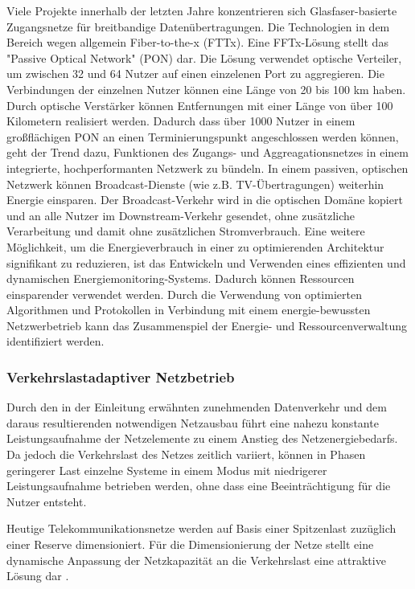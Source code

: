 Viele Projekte innerhalb der letzten Jahre konzentrieren sich Glasfaser-basierte Zugangsnetze für breitbandige Datenübertragungen. Die Technologien in dem Bereich wegen allgemein Fiber-to-the-x (FTTx). Eine FFTx-Lösung stellt das "Passive Optical Network" (PON) dar. Die Lösung verwendet optische Verteiler, um zwischen 32 und 64 Nutzer auf einen einzelenen Port zu aggregieren. Die Verbindungen der einzelnen Nutzer können eine Länge von 20 bis 100 km haben. Durch optische Verstärker können Entfernungen mit einer Länge von über 100 Kilometern realisiert werden. Dadurch dass über 1000 Nutzer in einem großflächigen PON an einen Terminierungspunkt angeschlossen werden können, geht der Trend dazu, Funktionen des Zugangs- und Aggreagationsnetzes in einem integrierte, hochperformanten Netzwerk zu bündeln. In einem passiven, optischen Netzwerk können Broadcast-Dienste (wie z.B. TV-Übertragungen) weiterhin Energie einsparen. Der Broadcast-Verkehr wird in die optischen Domäne kopiert und an alle Nutzer im Downstream-Verkehr gesendet, ohne zusätzliche Verarbeitung und damit ohne zusätzlichen Stromverbrauch. \cite{aleksic2013}
Eine weitere Möglichkeit, um die Energieverbrauch in einer zu optimierenden Architektur signifikant zu reduzieren, ist das Entwickeln und Verwenden eines effizienten und dynamischen Energiemonitoring-Systems. Dadurch können Ressourcen einsparender verwendet werden. Durch die Verwendung von optimierten Algorithmen und Protokollen in Verbindung mit einem energie-bewussten Netzwerbetrieb kann das Zusammenspiel der Energie- und Ressourcenverwaltung identifiziert werden. \cite{aleksic2013}

\subsubsection{Verkehrslastadaptiver Netzbetrieb}
Durch den in der Einleitung erwähnten zunehmenden Datenverkehr und dem daraus resultierenden notwendigen Netzausbau führt eine nahezu konstante Leistungsaufnahme der Netzelemente zu einem Anstieg des Netzenergiebedarfs. Da jedoch die Verkehrslast des Netzes zeitlich variiert, können in Phasen geringerer Last einzelne Systeme in einem Modus mit niedrigerer Leistungsaufnahme betrieben werden, ohne dass eine Beeinträchtigung für die Nutzer entsteht.

Heutige Telekommunikationsnetze werden auf Basis einer Spitzenlast zuzüglich einer Reserve dimensioniert. Für die Dimensionierung der Netze stellt eine dynamische Anpassung der Netzkapazität an die Verkehrslast eine attraktive Lösung dar \cite{lange}.

